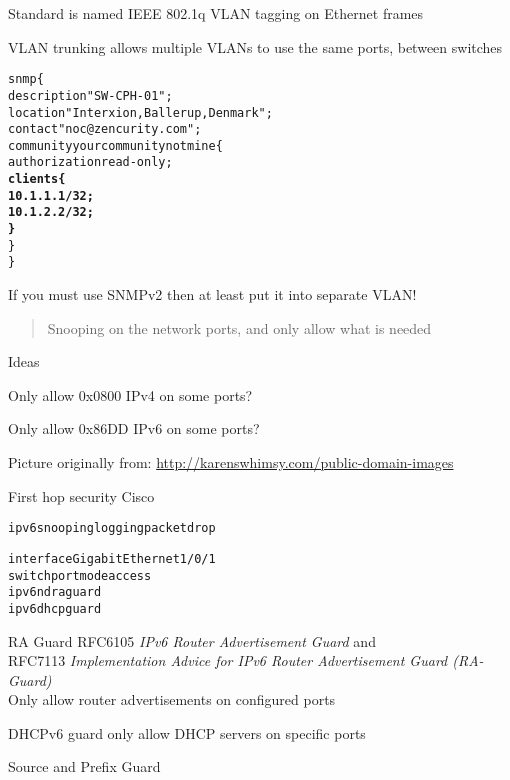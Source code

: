 \documentclass[Screen16to9,17pt]{foils}
\newcommand{\myalert}{\color{red}\faFlag}
\begin{document}


\begin{list1}
\item Standard is named IEEE 802.1q VLAN tagging  on Ethernet frames
\item VLAN trunking allows multiple VLANs to use the same ports, between switches
\end{list1}



\begin{alltt}
snmp \{
    description "SW-CPH-01";
    location "Interxion, Ballerup, Denmark";
    contact "noc@zencurity.com";
    community yourcommunitynotmine \{
        authorization read-only;
        {\bf clients \{
               10.1.1.1/32;
               10.1.2.2/32;
        \}    }
    \}
\}
\end{alltt}

If you must use SNMPv2 then at least put it into separate VLAN! {\myalert}



\begin{quote}
Snooping on the network ports, and only allow what is needed
\end{quote}

Ideas
\begin{list2}
\item Only allow 0x0800 IPv4 on some ports?
\item Only allow 0x86DD IPv6 on some ports?
\end{list2}



\centerline{Picture originally from: \url{http://karenswhimsy.com/public-domain-images}}




First hop security Cisco
\begin{alltt}\small
ipv6 snooping logging packet drop

interface GigabitEthernet1/0/1
    switchport mode access
    ipv6 nd raguard
    ipv6 dhcp guard
\end{alltt}

\begin{list2}
\item RA Guard RFC6105 \emph{IPv6 Router Advertisement Guard} and \\
RFC7113 \emph{Implementation Advice for IPv6 Router Advertisement Guard (RA-Guard)}\\
Only allow router advertisements on configured ports
\item DHCPv6 guard only allow DHCP servers on specific ports
\item Source and Prefix Guard
\end{list2}
\end{document}
